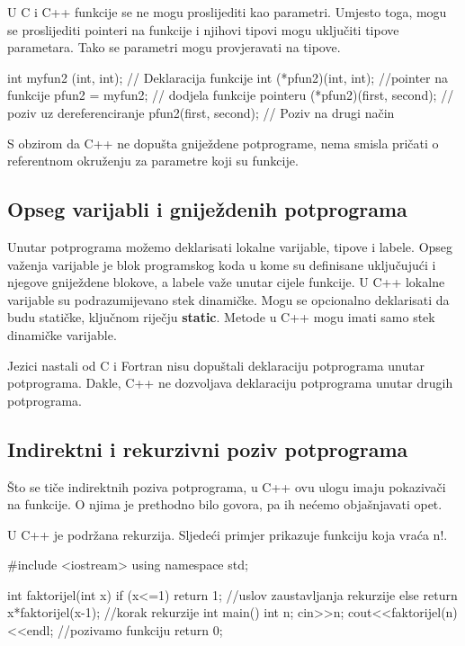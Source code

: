 \documentclass[11pt]{book}
\begin{document}
U C i C++ funkcije se ne mogu proslijediti kao parametri. Umjesto toga, mogu se proslijediti pointeri na funkcije i njihovi tipovi mogu uključiti tipove parametara. Tako se parametri mogu provjeravati na tipove.

\begin{shortlisting}
  int myfun2 (int, int); // Deklaracija funkcije
  int (*pfun2)(int, int);  //pointer na funkcije
  pfun2 = myfun2;  // dodjela funkcije pointeru
  (*pfun2)(first, second);  // poziv uz dereferenciranje
  pfun2(first, second);  // Poziv na drugi način
\end{shortlisting}

S obzirom da C++ ne dopušta gniježdene potprograme, nema smisla pričati o referentnom okruženju za parametre koji su funkcije.

\subsection{Opseg varijabli i gniježdenih potprograma}
Unutar potprograma možemo deklarisati lokalne varijable, tipove i labele. Opseg važenja varijable je blok programskog koda u kome su definisane uključujući i njegove gniježdene blokove, a labele važe unutar cijele funkcije. U C++ lokalne varijable su podrazumijevano stek dinamičke. Mogu se opcionalno deklarisati da budu statičke, ključnom riječju \textbf{static}. Metode u C++ mogu imati samo stek dinamičke varijable.

Jezici nastali od C i Fortran nisu dopuštali deklaraciju potprograma unutar potprograma. Dakle, C++ ne dozvoljava deklaraciju potprograma unutar drugih potprograma.

\subsection{Indirektni i rekurzivni poziv potprograma}

Što se tiče indirektnih poziva potprograma, u C++ ovu ulogu imaju pokazivači na funkcije. O  njima je prethodno bilo govora, pa ih nećemo objašnjavati opet.

U C++ je podržana rekurzija. Sljedeći primjer prikazuje funkciju koja vraća n!.
\begin{shortlisting}
  #include <iostream>
  using namespace std;

  int faktorijel(int x)
    {
      if (x<=1) return 1; //uslov zaustavljanja rekurzije
      else return x*faktorijel(x-1); //korak rekurzije
    }
  int main()  {
      int n;
      cin>>n;
      cout<<faktorijel(n)<<endl; //pozivamo funkciju
      return 0;
    }
\end{shortlisting}
\end{document}
